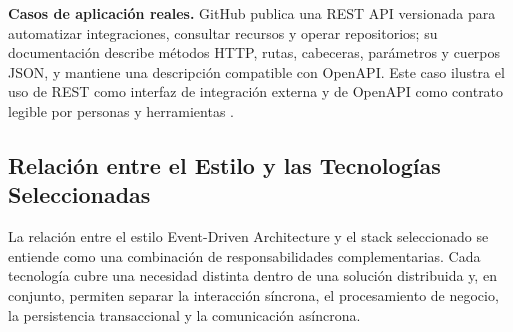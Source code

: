 \documentclass[12pt,a4paper]{article}
\begin{document}
\textbf{Casos de aplicación reales.} GitHub publica una REST API versionada para automatizar integraciones, consultar recursos y operar repositorios; su documentación describe métodos HTTP, rutas, cabeceras, parámetros y cuerpos JSON, y mantiene una descripción compatible con OpenAPI. Este caso ilustra el uso de REST como interfaz de integración externa y de OpenAPI como contrato legible por personas y herramientas \cite{github-rest-api}.

\subsection{Relación entre el Estilo y las Tecnologías Seleccionadas}

La relación entre el estilo Event-Driven Architecture y el stack seleccionado se entiende como una combinación de responsabilidades complementarias. Cada tecnología cubre una necesidad distinta dentro de una solución distribuida y, en conjunto, permiten separar la interacción síncrona, el procesamiento de negocio, la persistencia transaccional y la comunicación asíncrona.
\end{document}
